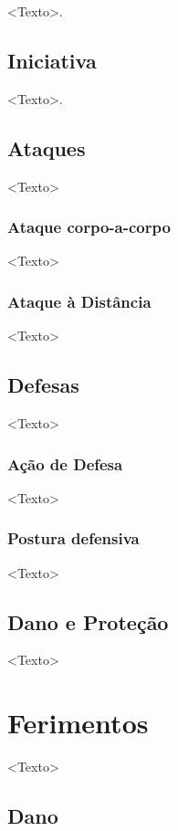 \documentclass[a4paper, twocolumn, 10pt]{book}
\begin{document}
<Texto>.

\section{Iniciativa}

<Texto>.

\section{Ataques}

<Texto>

\subsection{Ataque corpo-a-corpo}

<Texto>

\subsection{Ataque à Distância}

<Texto>

\section{Defesas}

<Texto>

\subsection{Ação de Defesa}

<Texto>

\subsection{Postura defensiva}

<Texto>

\section{Dano e Proteção}

<Texto>

\chapter{Ferimentos}

<Texto>

\section{Dano}
\end{document}
